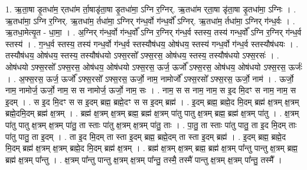 \documentclass[17pt]{extarticle}
\begin{document}
1. ऋ॒ता॒षा डृ॒तधा॑म॒ र्‌तधा॑म र्ता॒षाडृ॑ता॒षा डृ॒तधा॑मा॒ ऽग्नि र॒ग्निर्. 
ऋ॒तधा॑म र्‌ता॒षा डृ॑ता॒षा डृ॒तधा॑मा॒ ऽग्निः । . ऋ॒तधा॑मा॒ ऽग्नि र॒ग्निर्. ऋ॒तधा॑म॒ र्तधा॑मा॒ ऽग्निर् ग॑न्ध॒र्वो ग॑न्ध॒र्वो᳚ ऽग्निर्. ऋ॒तधा॑म॒ र्तधा॑मा॒ ऽग्निर् ग॑न्ध॒र्वः । . ऋ॒तधा॒मेत्यृ॒त - धा॒मा॒ । . अ॒ग्निर् ग॑न्ध॒र्वो ग॑न्ध॒र्वो᳚ ऽग्नि र॒ग्निर् ग॑न्ध॒र्व स्तस्य॒ तस्य॑ गन्ध॒र्वो᳚ ऽग्नि र॒ग्निर् ग॑न्ध॒र्व स्तस्य॑ । . ग॒न्ध॒र्व स्तस्य॒ तस्य॑ गन्ध॒र्वो ग॑न्ध॒र्व स्तस्यौष॑धय॒ ओष॑धय॒ स्तस्य॑ गन्ध॒र्वो 
ग॑न्ध॒र्व स्तस्यौष॑धयः । . तस्यौष॑धय॒ ओष॑धय॒ स्तस्य॒ तस्यौष॑धयो ऽफ्स॒रसो᳚ ऽफ्स॒रस॒ ओष॑धय॒ स्तस्य॒ 
तस्यौष॑धयो ऽफ्स॒रसः॑ । . ओष॑धयो ऽफ्स॒रसो᳚ ऽफ्स॒रस॒ ओष॑धय॒ ओष॑धयो ऽफ्स॒रस॒ ऊर्ज॒ ऊर्जो᳚ ऽफ्स॒रस॒ ओष॑धय॒ ओष॑धयो ऽफ्स॒रस॒ ऊर्जः॑ । . अ॒फ्स॒रस॒ ऊर्ज॒ ऊर्जो᳚ ऽफ्स॒रसो᳚ ऽफ्स॒रस॒ ऊर्जो॒ नाम॒ नामोर्जो᳚ ऽफ्स॒रसो᳚ ऽफ्स॒रस॒ ऊर्जो॒ नाम॑ । . ऊर्जो॒ नाम॒ नामोर्ज॒ ऊर्जो॒ नाम॒ स स नामोर्ज॒ ऊर्जो॒ नाम॒ सः । . नाम॒ स स नाम॒ नाम॒ स इ॒द मि॒दꣳ स नाम॒ नाम॒ स इ॒दम् । . स इ॒द मि॒दꣳ स स इ॒दम् ब्रह्म॒ ब्रह्मे॒दꣳ स स इ॒दम् ब्रह्म॑ । . इ॒दम् ब्रह्म॒ ब्रह्मे॒द मि॒दम् ब्रह्म॑ क्ष॒त्रम् क्ष॒त्रम् ब्रह्मे॒दमि॒दम् ब्रह्म॑ क्ष॒त्रम् । . ब्रह्म॑ क्ष॒त्रम् क्ष॒त्रम् ब्रह्म॒ ब्रह्म॑ क्ष॒त्रम् पा॑तु पातु क्ष॒त्रम् ब्रह्म॒ ब्रह्म॑ क्ष॒त्रम् पा॑तु । . क्ष॒त्रम् पा॑तु पातु क्ष॒त्रम् क्ष॒त्रम् पा॑तु॒ ता स्ताः पा॑तु क्ष॒त्रम् क्ष॒त्रम् पा॑तु॒ ताः । . पा॒तु॒ ता स्ताः पा॑तु पातु॒ ता इ॒द मि॒दम् ताः पा॑तु पातु॒ ता इ॒दम् । . ता इ॒द मि॒दम् ता स्ता इ॒दम् ब्रह्म॒ ब्रह्मे॒दम् ता स्ता इ॒दम् ब्रह्म॑ । . इ॒दम् ब्रह्म॒ ब्रह्मे॒द मि॒दम् ब्रह्म॑ क्ष॒त्रम् क्ष॒त्रम् ब्रह्मे॒द मि॒दम् ब्रह्म॑ क्ष॒त्रम् । . ब्रह्म॑ क्ष॒त्रम् क्ष॒त्रम् ब्रह्म॒ ब्रह्म॑ क्ष॒त्रम् पा᳚न्तु पान्तु क्ष॒त्रम् ब्रह्म॒ ब्रह्म॑ क्ष॒त्रम् पा᳚न्तु । . क्ष॒त्रम् पा᳚न्तु पान्तु क्ष॒त्रम् क्ष॒त्रम् पा᳚न्तु॒ तस्मै॒ तस्मै॑ पान्तु क्ष॒त्रम् क्ष॒त्रम् पा᳚न्तु॒ तस्मै᳚ । \newline
\end{document}
